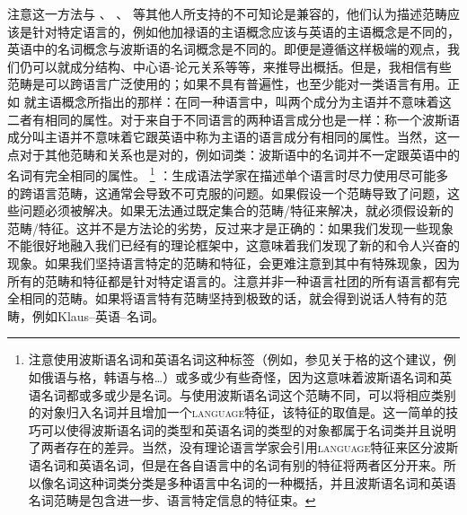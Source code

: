 注意这一方法与 \citet{Haspelmath2010a}、 \citet{Dryer97a-u}、 \citet[\S~1.4.2--1.4.3]{Croft2001a}等其他人所支持的不可知论是兼容的，他们认为描述范畴应该是针对特定语言的，例如他加禄语的主语概念应该与英语的主语概念是不同的，英语中的名词概念与波斯语的名词概念是不同的。即便是遵循这样极端的观点，我们仍可以就成分结构、中心语-论元关系等等，来推导出概括。但是，我相信有些范畴是可以跨语言广泛使用的；如果不具有普遍性，也至少能对一类语言有用。正如 \citet[]{Newmeyer2010a}就主语概念所指出的那样：在同一种语言中，叫两个成分为主语并不意味着这二者有相同的属性。对于来自于不同语言的两种语言成分也是一样：称一个波斯语成分叫主语并不意味着它跟英语中称为主语的语言成分有相同的属性。当然，这一点对于其他范畴和关系也是对的，例如词类：波斯语中的名词并不一定跟英语中的名词有完全相同的属性。 \footnote{%
注意使用波斯语名词和英语名词这种标签（例如，参见\citet[\S~2]{Haspelmath2010a}关于格的这个建议，例如俄语与格，韩语与格\ldots）或多或少有些奇怪，因为这意味着波斯语名词和英语名词都或多或少是名词。与使用波斯语名词这个范畴不同，可以将相应类别的对象归入名词并且增加一个\textsc{language}特征，该特征的取值是。这一简单的技巧可以使得波斯语名词的类型和英语名词的类型的对象都属于名词类并且说明了两者存在的差异。当然，没有理论语言学家会引用\textsc{language}特征来区分波斯语名词和英语名词，但是在各自语言中的名词有别的特征将两者区分开来。所以像名词这种词类分类是多种语言中名词的一种概括，并且波斯语名词和英语名词范畴是包含进一步、语言特定信息的特征束。  
} \citet[]{Haspelmath2010b}：生成语法学家在描述单个语言时尽力使用尽可能多的跨语言范畴，这通常会导致不可克服的问题。如果假设一个范畴导致了问题，这些问题必须被解决。如果无法通过既定集合的范畴/特征来解决，就必须假设新的范畴/特征。这并不是方法论的劣势，反过来才是正确的：如果我们发现一些现象不能很好地融入我们已经有的理论框架中，这意味着我们发现了新的和令人兴奋的现象。如果我们坚持语言特定的范畴和特征，会更难注意到其中有特殊现象，因为所有的范畴和特征都是针对特定语言的。注意并非一种语言社团的所有语言都有完全相同的范畴。如果将语言特有范畴坚持到极致的话，就会得到说话人特有的范畴，例如Klaus--英语--名词。
